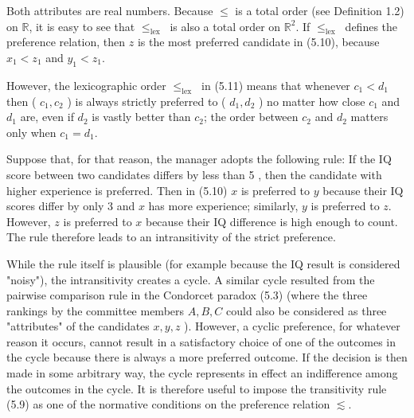 \documentclass[12pt]{article}
\begin{document}
Both attributes are real numbers. Because $\leq$ is a total order (see Definition 1.2) on $\mathbb{R}$, it is easy to see that $\leq_{\text {lex }}$ is also a total order on $\mathbb{R}^{2}$. If $\leq_{\text {lex }}$ defines the preference relation, then $z$ is the most preferred candidate in (5.10), because $x_{1}<z_{1}$ and $y_{1}<z_{1}$.

However, the lexicographic order $\leq_{\text {lex }}$ in (5.11) means that whenever $c_{1}<d_{1}$ then ( $c_{1}, c_{2}$ ) is always strictly preferred to ( $d_{1}, d_{2}$ ) no matter how close $c_{1}$ and $d_{1}$ are, even if $d_{2}$ is vastly better than $c_{2}$; the order between $c_{2}$ and $d_{2}$ matters only when $c_{1}=d_{1}$.

Suppose that, for that reason, the manager adopts the following rule: If the IQ score between two candidates differs by less than 5 , then the candidate with higher experience is preferred. Then in (5.10) $x$ is preferred to $y$ because their IQ scores differ by only 3 and $x$ has more experience; similarly, $y$ is preferred to $z$. However, $z$ is preferred to $x$ because their IQ difference is high enough to count. The rule therefore leads to an intransitivity of the strict preference.

While the rule itself is plausible (for example because the IQ result is considered "noisy"), the intransitivity creates a cycle. A similar cycle resulted from the pairwise comparison rule in the Condorcet paradox (5.3) (where the three rankings by the committee members $A, B, C$ could also be considered as three "attributes" of the candidates $x, y, z$ ). However, a cyclic preference, for whatever reason it occurs, cannot result in a satisfactory choice of one of the outcomes in the cycle because there is always a more preferred outcome. If the decision is then made in some arbitrary way, the cycle represents in effect an indifference among the outcomes in the cycle. It is therefore useful to impose the transitivity rule (5.9) as one of the normative conditions on the preference relation $\lesssim$.
\end{document}

